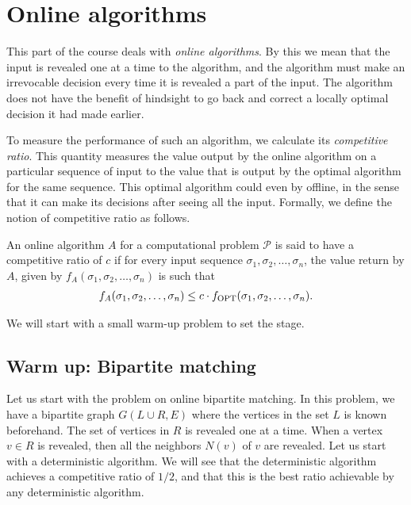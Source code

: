 \chapter{Online algorithms}

This part of the course deals with \emph{online algorithms}. By this we mean that the input is revealed one at a time to the algorithm, and the algorithm must make an irrevocable decision every time it is revealed a part of the input. The algorithm does not have the benefit of hindsight to go back and correct a locally optimal decision it had made earlier. 

To measure the performance of such an algorithm, we calculate its \emph{competitive ratio}. This quantity measures the value output by the online algorithm on a particular sequence of input to the value that is output by the optimal algorithm for the same sequence. This optimal algorithm could even by offline, in the sense that it can make its decisions after seeing all the input. Formally, we define the notion of competitive ratio as follows.

\begin{definition}
	An online algorithm $A$ for a computational problem $\mathcal{P}$ is
        said to have a competitive ratio of $c$ if for every input sequence
        $\sigma_1, \sigma_2, \ldots, \sigma_n$, the value return by $A$, given
        by $f_A(\sigma_1, \sigma_2, \ldots, \sigma_n)$ is such that
	\begin{align*}
          f_A(\sigma_1,\sigma_2,\ldots,\sigma_n) \leq c\cdot f_{\operatorname{OPT}}(\sigma_1,\sigma_2,\ldots,\sigma_n).
	\end{align*}
	\label{def:comp-ratio}
\end{definition}

We will start with a small warm-up problem to set the stage.

\section{Warm up: Bipartite matching}

Let us start with the problem on online bipartite matching. In this problem, we have a bipartite graph $G(L\cup R, E)$ where the vertices in the set $L$ is known beforehand. The set of vertices in $R$ is revealed one at a time. When a vertex $v \in R$ is revealed, then all the neighbors $N(v)$ of $v$ are revealed. Let us start with a deterministic algorithm. We will see that the deterministic algorithm achieves a competitive ratio of $1/2$, and that this is the best ratio achievable by any deterministic algorithm.


